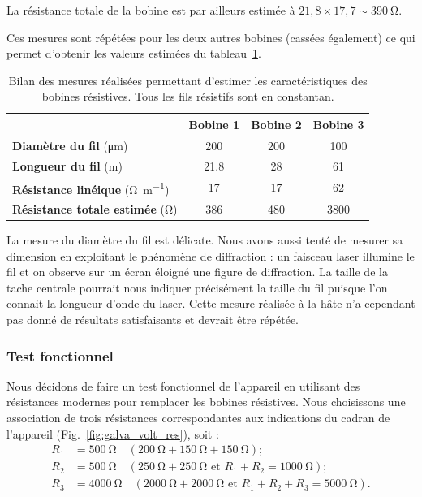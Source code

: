 \documentclass[12pt,a4paper,fleqn]{article}
\begin{document}
La résistance totale de la bobine est par ailleurs estimée à $21{,}8 \times 17{,}7 \sim \SI{390}{\ohm}$.

Ces mesures sont répétées pour les deux autres bobines (cassées également) ce qui permet d'obtenir les valeurs estimées du tableau~\ref{tab:bobines}.

\begin{table}[htbp]
    \center
    \begin{tabular}{l|c|c|c}
    & \textbf{Bobine 1} & \textbf{Bobine 2} & \textbf{Bobine 3} \\
    \hline \hline
    \textbf{Diamètre du fil} (\unit{\um})                           & \num{200} & \num{200}   & \num{100} \\
    \textbf{Longueur du fil} (\unit{m})                             & \num{21,8} & \num{28}    & \num{61}\\
    \textbf{Résistance linéique} (\unit{\ohm\per\metre})& \num{17}    & \num{17}    & \num{62}\\
    \textbf{Résistance totale estimée} (\unit{\ohm})       & \num{386}  & \num{480}  & \num{3800}\\
    \end{tabular}
    \caption{Bilan des mesures réalisées permettant d'estimer les caractéristiques des bobines résistives.
    Tous les fils résistifs sont en constantan.}
    \label{tab:bobines}
\end{table}

La mesure du diamètre du fil est délicate.
Nous avons aussi tenté de mesurer sa dimension en exploitant le phénomène de diffraction : un faisceau laser illumine le fil et on observe sur un écran éloigné une figure de diffraction.
La taille de la tache centrale pourrait nous indiquer précisément la taille du fil puisque l'on connait la longueur d'onde du laser.
Cette mesure réalisée à la hâte n'a cependant pas donné de résultats satisfaisants et devrait être répétée.

\subsubsection{Test fonctionnel}

Nous décidons de faire un test fonctionnel de l'appareil en utilisant des résistances modernes pour remplacer les bobines résistives.
Nous choisissons une association de trois résistances correspondantes aux indications du cadran de l'appareil (Fig.~\ref{fig:galva_volt_res}), soit :
\begin{align*}
R_1 &= \qty{500}{\ohm} \quad (\qty{200}{\ohm} +\qty{150}{\ohm} + \qty{150}{\ohm}) ;\\
R_2 &= \qty{500}{\ohm} \quad (\qty{250}{\ohm} + \qty{250}{\ohm} \text{ et } R_1 + R_2 = \qty{1000}{\ohm}) ;\\
R_3 &= \qty{4000}{\ohm} \quad (\qty{2000}{\ohm} + \qty{2000}{\ohm} \text{ et } R_1 + R_2 + R_3 = \qty{5000}{\ohm}).
\end{align*}
\end{document}
